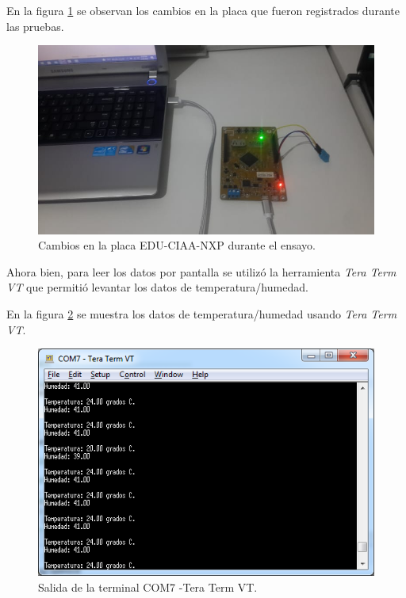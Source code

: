 En la figura \ref{fig:TestPlaca} se observan los cambios en la placa que fueron registrados durante las pruebas.


\begin{figure}[ht]
	\centering
	\includegraphics[scale=.50]{./Figures/TestPlaca.jpeg}
	\caption{Cambios en la placa EDU-CIAA-NXP durante el ensayo.}
	\label{fig:TestPlaca}
\end{figure}


Ahora bien, para leer los datos por pantalla se utilizó la herramienta \textit{Tera Term VT} que permitió levantar los datos de temperatura/humedad.

En la figura \ref{fig:TestTerminal} se muestra los datos de temperatura/humedad usando \textit{Tera Term VT}. 


\begin{figure}[ht]
	\centering
	\includegraphics[scale=.90]{./Figures/TestTerminal.png}
	\caption{Salida de la terminal COM7 -Tera Term VT.}
	\label{fig:TestTerminal}
\end{figure}



